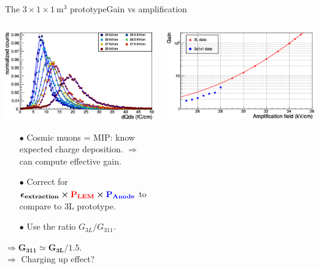 \documentclass[10pt]{beamer}
\begin{document}
    \begin{frame}{The \texorpdfstring{$3 \times 1 \times \SI{1}{\meter\cubed}$}{311} prototype}{Gain vs amplification}
    	\begin{scriptsize}
	    	\begin{columns}
	    		\begin{column}{0.5\textwidth}
	    			\includegraphics[width=\textwidth]{figures/311/dQds_gain.png}\\
	    			\vfill
	    			\begin{itemize}
	    				\item[$\bullet$] Cosmic muons = MIP: know expected charge deposition. $\Rightarrow$ can compute effective gain.
	    				\item[$\bullet$] Correct for $\mathbf{\boldsymbol{\epsilon}_{extraction}\boldsymbol{\times}\textcolor{red}{P_{LEM}}\boldsymbol{\times} \textcolor{blue}{P_{Anode}}}$ to compare to 3L prototype.
	    				\item[$\bullet$] Use the ratio $G_{3L}/G_{311}$.
	    			\end{itemize}
	    			$\mathbf{\Rightarrow G_{311} \boldsymbol{\simeq} G_{3L}/1.5}$.\\
	    			$\Rightarrow$ Charging up effect?\\
	    		\end{column}
	    		\hfill
	    		\begin{column}{0.5\textwidth}
	    			\centering
	    			\includegraphics[width=.9\textwidth]{figures/311/gain_311.png}\\

\end{column}
\end{columns}
\end{scriptsize}
\end{frame}
\end{document}
